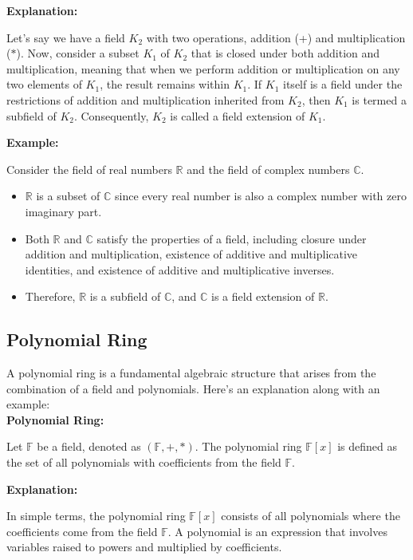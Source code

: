 \documentclass[11pt]{article}
\begin{document}
\textbf{Explanation:}

Let's say we have a field \( K_2 \) with two operations, addition (+) and multiplication (\(\ast\)). Now, consider a subset \( K_1 \) of \( K_2 \) that is closed under both addition and multiplication, meaning that when we perform addition or multiplication on any two elements of \( K_1 \), the result remains within \( K_1 \). If \( K_1 \) itself is a field under the restrictions of addition and multiplication inherited from \( K_2 \), then \( K_1 \) is termed a subfield of \( K_2 \). Consequently, \( K_2 \) is called a field extension of \( K_1 \).

\textbf{Example:}

Consider the field of real numbers \( \mathbb{R} \) and the field of complex numbers \( \mathbb{C} \).
\begin{itemize}
    \item \( \mathbb{R} \) is a subset of \( \mathbb{C} \) since every real number is also a complex number with zero imaginary part.
    \item Both \( \mathbb{R} \) and \( \mathbb{C} \) satisfy the properties of a field, including closure under addition and multiplication, existence of additive and multiplicative identities, and existence of additive and multiplicative inverses.
    \item Therefore, \( \mathbb{R} \) is a subfield of \( \mathbb{C} \), and \( \mathbb{C} \) is a field extension of \( \mathbb{R} \).
\end{itemize}

\subsection{Polynomial Ring}

A polynomial ring is a fundamental algebraic structure that arises from the combination of a field and polynomials. Here's an explanation along with an example:\\

\textbf{Polynomial Ring:}

Let \( \mathbb{F} \) be a field, denoted as \( (\mathbb{F}, +, \ast) \). The polynomial ring \( \mathbb{F}[x] \) is defined as the set of all polynomials with coefficients from the field \( \mathbb{F} \).

\textbf{Explanation:}

In simple terms, the polynomial ring \( \mathbb{F}[x] \) consists of all polynomials where the coefficients come from the field \( \mathbb{F} \). A polynomial is an expression that involves variables raised to powers and multiplied by coefficients.
\end{document}
